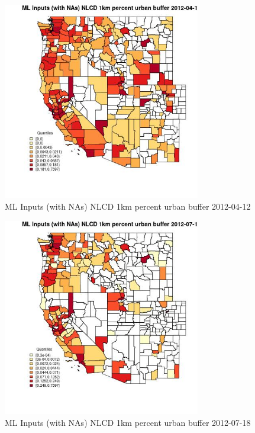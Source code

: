 \begin{figure} 
\centering  
\includegraphics[width=0.77\textwidth]{Code_Outputs/Report_ML_input_PM25_Step4_part_e_de_duplicated_aves_compiled_2019-05-14wNAs_CountyNLCD_1km_percent_urban_bufferMean2012-04-12_2012-04-12.jpg} 
\caption{\label{fig:Report_ML_input_PM25_Step4_part_e_de_duplicated_aves_compiled_2019-05-14wNAsCountyNLCD_1km_percent_urban_bufferMean2012-04-12_2012-04-12}ML Inputs (with NAs) NLCD 1km percent urban buffer 2012-04-12} 
\end{figure} 
 

\begin{figure} 
\centering  
\includegraphics[width=0.77\textwidth]{Code_Outputs/Report_ML_input_PM25_Step4_part_e_de_duplicated_aves_compiled_2019-05-14wNAs_CountyNLCD_1km_percent_urban_bufferMean2012-07-18_2012-07-18.jpg} 
\caption{\label{fig:Report_ML_input_PM25_Step4_part_e_de_duplicated_aves_compiled_2019-05-14wNAsCountyNLCD_1km_percent_urban_bufferMean2012-07-18_2012-07-18}ML Inputs (with NAs) NLCD 1km percent urban buffer 2012-07-18} 
\end{figure} 
 

